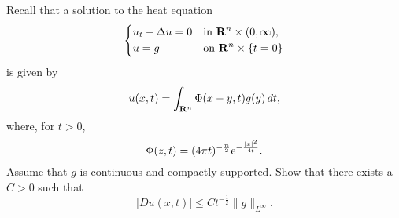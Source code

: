 \begin{problem}
  Recall that a solution to the heat equation
  \[
    \left\{
      \begin{aligned}
        &u_t-\Delta u=0&&\text{in \(\mathbf{R}^n\times(0,\infty)\),}\\
        &u=g&&\text{on \(\mathbf{R}^n\times\{t=0\}\)}
      \end{aligned}
    \right.
  \]
  is given by
  \[
    u(x,t)=\int_{\mathbf{R}^n}\Phi(x-y,t)g(y)\mathop{}\!d t,
  \]
  where, for \(t>0\),
  \[
    \Phi(z,t)=(4\pi t)^{-\frac{n}{2}}\mathrm{e}^{-\frac{|x|^2}{4t}}.
  \]
  Assume that \(g\) is continuous and compactly supported. Show that there
  exists a \(C>0\) such that
  \[
    |D u(x,t)|\leq Ct^{-\frac{1}{2}}\|g\|_{L^\infty}.
  \]
\end{problem}
\begin{solution*}
\end{solution*}

